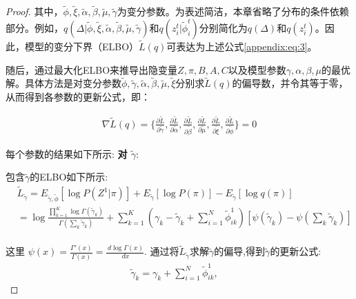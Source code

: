 \begin{proof}
	其中，$\widetilde{\phi}, \widetilde{\xi}, \widetilde{\alpha}, \widetilde{\beta}, \widetilde{\mu}, \widetilde{\gamma}$为变分参数。为表述简洁，本章省略了分布的条件依赖部分。例如，$q(\Delta|\widetilde{\phi},\widetilde{\xi},\widetilde{\alpha},\widetilde{\beta},\widetilde{\mu},\widetilde{\gamma})$和$q(z_i^t|\widetilde{\phi}_i^t)$分别简化为$q(\Delta)$和$q(z_i^t)$。因此，模型的变分下界（ELBO）$\widetilde{L}(q)$可表达为上述公式\ref{appendix:eq:3}。
	
	随后，通过最大化ELBO来推导出隐变量$Z, \pi, B, A, C$以及模型参数$\gamma, \alpha, \beta, \mu$的最优解。具体方法是对变分参数$\widetilde{\phi}, \widetilde{\gamma}, \widetilde{\alpha}, \widetilde{\beta}, \widetilde{\mu}, \widetilde{\xi}$分别求$\widetilde{L}(q)$的偏导数，并令其等于零，从而得到各参数的更新公式，即：
	
	\begin{equation}
		\begin{split}
			\nabla \widetilde{L}(q) = \{ \frac{\partial \widetilde{L}}{\partial \widetilde{\gamma}}, \frac{\partial \widetilde{L}}{\partial \widetilde{\alpha}}, \frac{\partial \widetilde{L}}{\partial \widetilde{\beta}}, \frac{\partial \widetilde{L}}{\partial \widetilde{\mu}}, \frac{\partial \widetilde{L}}{\partial \widetilde{\xi}}, \frac{\partial \widetilde{L}}{\partial \widetilde{\phi}} \} = 0
		\end{split}
	\end{equation}
	
	每个参数的结果如下所示:
	\textbf{对 $\widetilde{\gamma}$}:
	
	包含$\widetilde{\gamma}$的ELBO如下所示:
	\begin{equation}
		\begin{split}
			& \widetilde{L}_{\widetilde{\gamma}} = E_{\widetilde{\gamma},\widetilde{\phi}}[\log P(Z^1|\pi)] + E_{\widetilde{\gamma}}[\log P(\pi)]- E_{\widetilde{\gamma}}[\log q(\pi)] \\
			& = \log{\frac{\prod_{k=1}^K \log \Gamma (\widetilde{\gamma}_k)}{\Gamma (\sum_k \widetilde{\gamma}_k)}} 
			+ \sum_{k=1}^K ( \gamma_k - \widetilde{\gamma}_k + \sum_{i=1}^N \widetilde{\phi}_{ik}^1)[\psi(\widetilde{\gamma}_k) - \psi(\sum_k \widetilde{\gamma}_k)]\\
		\end{split}
	\end{equation}
	
	这里 $\psi(x) = \frac{\Gamma'(x)}{\Gamma(x)} = \frac{\,d \log \Gamma(x)}{\, dx}$. 
	通过将$\widetilde{L}_{\widetilde{\gamma}}$求解$\widetilde{\gamma}$的偏导,得到$\widetilde{\gamma}$的更新公式:
	\begin{equation}
		\label{appendix:eq4}
		\begin{split}
			\widetilde{\gamma}_k = \gamma_k + \sum_{i=1}^N \widetilde{\phi}_{ik}^1, \quad
		\end{split}
	\end{equation}
	

\end{proof}
